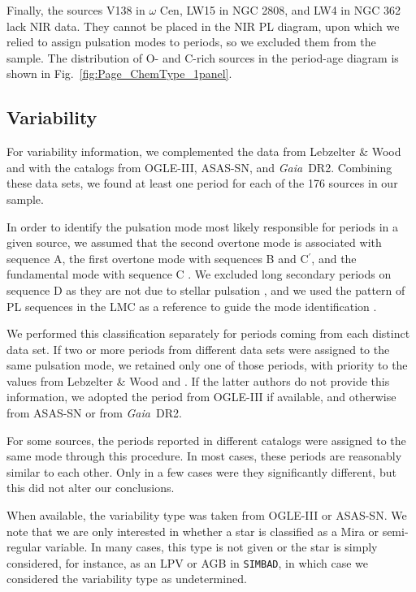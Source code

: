 \documentclass[letter]{aa}
\newcommand{\gaia}{\textit{Gaia}}
\newcommand{\simbad}{\texttt{SIMBAD}}
\newcommand{\cprime}{C$^{\prime}$}
\begin{document}
Finally, the sources V138 in $\omega$ Cen, LW15 in NGC 2808, and LW4 in NGC 362 lack NIR data. They cannot be placed in the NIR PL diagram, upon which we relied to assign pulsation modes to periods, so we excluded them from the sample. The distribution of O- and C-rich sources in the period-age diagram is shown in Fig.~\ref{fig:Page_ChemType_1panel}.

\subsection{Variability}
\label{asec:ClassificationOfObservedLPVs:Variability}

For variability information, we complemented the data from Lebzelter \& Wood and \citet{Kamath_etal_2010} with the catalogs from OGLE-III, ASAS-SN, and \gaia\ DR2. Combining these data sets, we found at least one period for each of the 176 sources in our sample.

In order to identify the pulsation mode most likely responsible for periods in a given source, we assumed that the second overtone mode is associated with sequence A, the first overtone mode with sequences B and \cprime, and the fundamental mode with sequence C \citep[e.g.,][]{Trabucchi_etal_2017}. We excluded long secondary periods on sequence D as they are not due to stellar pulsation \citep[][and references therein]{Soszynski_etal_2021}, and we used the pattern of PL sequences in the LMC as a reference to guide the mode identification \citep[cf.][]{Trabucchi_etal_2021_SRV1}.

We performed this classification separately for periods coming from each distinct data set. If two or more periods from different data sets were assigned to the same pulsation mode, we retained only one of those periods, with priority to the values from Lebzelter \& Wood and \citet{Kamath_etal_2010}. If the latter authors do not provide this information, we adopted the period from OGLE-III if available, and otherwise from ASAS-SN or from \gaia\ DR2.

For some sources, the periods reported in different catalogs were assigned to the same mode through this procedure. In most cases, these periods are reasonably similar to each other. Only in a few cases were they significantly different, but this did not alter our conclusions.

When available, the variability type was taken from OGLE-III or ASAS-SN. We note that we are only interested in whether a star is classified as a Mira or semi-regular variable. In many cases, this type is not given or the star is simply considered, for instance, as an LPV or AGB in \simbad, in which case we considered the variability type as undetermined.
\end{document}

